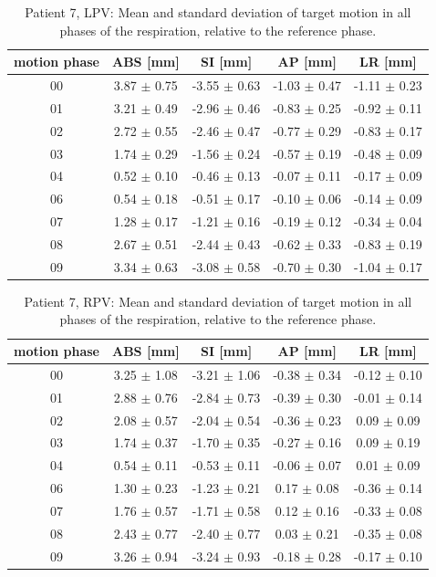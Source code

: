 \documentclass[type=dr, dr=rernat, accentcolor=tud7b,colorbacktitle, bigchapter, openright, twoside, 12pt ]{tudthesis}
\begin{document}

\begin{table}[H]
  \centering
\caption{Patient 7, LPV: Mean and standard deviation of target motion in all phases of the respiration, relative to the reference phase.}
  \begin{tabular}{|c|c|c|c|c|}
    \hline\hline
    motion phase & ABS [mm] & SI [mm] & AP [mm] & LR [mm]\\
    \hline 
00& 3.87 $\pm$ 0.75& -3.55 $\pm$ 0.63& -1.03 $\pm$ 0.47& -1.11 $\pm$ 0.23 \\
01& 3.21 $\pm$ 0.49& -2.96 $\pm$ 0.46& -0.83 $\pm$ 0.25& -0.92 $\pm$ 0.11 \\
02& 2.72 $\pm$ 0.55& -2.46 $\pm$ 0.47& -0.77 $\pm$ 0.29& -0.83 $\pm$ 0.17 \\
03& 1.74 $\pm$ 0.29& -1.56 $\pm$ 0.24& -0.57 $\pm$ 0.19& -0.48 $\pm$ 0.09 \\
04& 0.52 $\pm$ 0.10& -0.46 $\pm$ 0.13& -0.07 $\pm$ 0.11& -0.17 $\pm$ 0.09 \\
06& 0.54 $\pm$ 0.18& -0.51 $\pm$ 0.17& -0.10 $\pm$ 0.06& -0.14 $\pm$ 0.09 \\
07& 1.28 $\pm$ 0.17& -1.21 $\pm$ 0.16& -0.19 $\pm$ 0.12& -0.34 $\pm$ 0.04 \\
08& 2.67 $\pm$ 0.51& -2.44 $\pm$ 0.43& -0.62 $\pm$ 0.33& -0.83 $\pm$ 0.19 \\
09& 3.34 $\pm$ 0.63& -3.08 $\pm$ 0.58& -0.70 $\pm$ 0.30& -1.04 $\pm$ 0.17 \\
        \hline\hline
  \end{tabular}
\end{table}


\begin{table}[H]
  \centering
\caption{Patient 7, RPV: Mean and standard deviation of target motion in all phases of the respiration, relative to the reference phase.}
  \begin{tabular}{|c|c|c|c|c|}
    \hline\hline
    motion phase & ABS [mm] & SI [mm] & AP [mm] & LR [mm]\\
    \hline 
00& 3.25 $\pm$ 1.08& -3.21 $\pm$ 1.06& -0.38 $\pm$ 0.34& -0.12 $\pm$ 0.10 \\
01& 2.88 $\pm$ 0.76& -2.84 $\pm$ 0.73& -0.39 $\pm$ 0.30& -0.01 $\pm$ 0.14 \\
02& 2.08 $\pm$ 0.57& -2.04 $\pm$ 0.54& -0.36 $\pm$ 0.23& 0.09 $\pm$ 0.09 \\
03& 1.74 $\pm$ 0.37& -1.70 $\pm$ 0.35& -0.27 $\pm$ 0.16& 0.09 $\pm$ 0.19 \\
04& 0.54 $\pm$ 0.11& -0.53 $\pm$ 0.11& -0.06 $\pm$ 0.07& 0.01 $\pm$ 0.09 \\
06& 1.30 $\pm$ 0.23& -1.23 $\pm$ 0.21& 0.17 $\pm$ 0.08& -0.36 $\pm$ 0.14 \\
07& 1.76 $\pm$ 0.57& -1.71 $\pm$ 0.58& 0.12 $\pm$ 0.16& -0.33 $\pm$ 0.08 \\
08& 2.43 $\pm$ 0.77& -2.40 $\pm$ 0.77& 0.03 $\pm$ 0.21& -0.35 $\pm$ 0.08 \\
09& 3.26 $\pm$ 0.94& -3.24 $\pm$ 0.93& -0.18 $\pm$ 0.28& -0.17 $\pm$ 0.10 \\
        \hline\hline
  \end{tabular}
\end{table}
\end{document}
